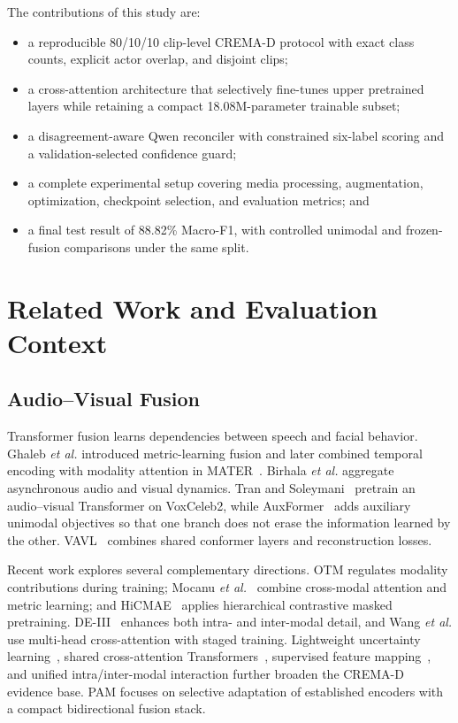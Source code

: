 \documentclass[conference]{IEEEtran}
\begin{document}
The contributions of this study are:
\begin{itemize}
  \item a reproducible 80/10/10 clip-level CREMA-D protocol with exact class
  counts, explicit actor overlap, and disjoint clips;
  \item a cross-attention architecture that selectively fine-tunes upper
  pretrained layers while retaining a compact 18.08M-parameter trainable
  subset;
  \item a disagreement-aware Qwen reconciler with constrained six-label
  scoring and a validation-selected confidence guard;
  \item a complete experimental setup covering media processing, augmentation,
  optimization, checkpoint selection, and evaluation metrics; and
  \item a final test result of 88.82\% Macro-F1, with controlled unimodal and
  frozen-fusion comparisons under the same split.
\end{itemize}

\section{Related Work and Evaluation Context}
\label{sec:related}

\subsection{Audio--Visual Fusion}

Transformer fusion learns dependencies between speech and facial behavior.
Ghaleb \emph{et al.} introduced metric-learning fusion
\cite{ghaleb2020merml} and later combined temporal encoding with modality
attention in MATER~\cite{ghaleb2023mater}. Birhala \emph{et al.}
\cite{birhala2020temporal} aggregate asynchronous audio and visual dynamics.
Tran and Soleymani~\cite{tran2022pretrained} pretrain an audio--visual
Transformer on VoxCeleb2, while AuxFormer~\cite{goncalves2022auxformer}
adds auxiliary unimodal objectives so that one branch does not erase the
information learned by the other. VAVL~\cite{goncalves2025vavl} combines
shared conformer layers and reconstruction losses.

Recent work explores several complementary directions. OTM
\cite{wei2024otm} regulates modality contributions during training; Mocanu
\emph{et al.}~\cite{mocanu2023crossmodal} combine cross-modal attention and
metric learning; and HiCMAE~\cite{sun2024hicmae} applies hierarchical
contrastive masked pretraining. DE-III~\cite{shi2024deiii} enhances both
intra- and inter-modal detail, and Wang \emph{et al.}
\cite{wang2025cmmha} use multi-head cross-attention with staged training.
Lightweight uncertainty learning~\cite{radoi2024uncertainty}, shared
cross-attention Transformers~\cite{lei2026cams}, supervised feature
mapping~\cite{najaran2026mapping}, and unified intra/inter-modal interaction
\cite{fmii2026} further broaden the CREMA-D evidence base. PAM focuses on
selective adaptation of established encoders with a compact bidirectional
fusion stack.
\end{document}
